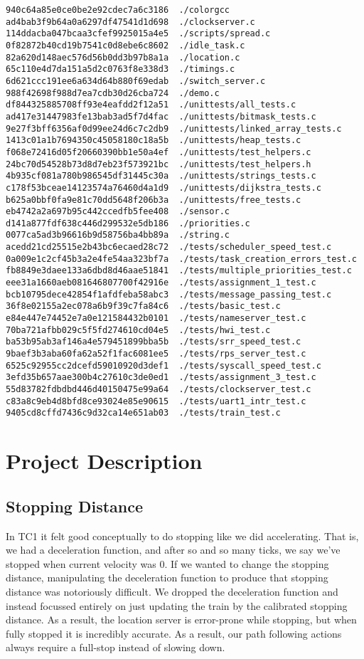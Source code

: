 \documentclass[letterpaper]{article}
\begin{document}
\begin{verbatim}
940c64a85e0ce0be2e92cdec7a6c3186  ./colorgcc
ad4bab3f9b64a0a6297df47541d1d698  ./clockserver.c
114ddacba047bcaa3cfef9925015a4e5  ./scripts/spread.c
0f82872b40cd19b7541c0d8ebe6c8602  ./idle_task.c
82a620d148aec576d56b0dd3b97b8a1a  ./location.c
65c110e4d7da151a5d2c0763f8e338d3  ./timings.c
6d621ccc191ee6a634d64b880f69edab  ./switch_server.c
988f42698f988d7ea7cdb30d26cba724  ./demo.c
df844325885708ff93e4eafdd2f12a51  ./unittests/all_tests.c
ad417e31447983fe13bab3ad5f7d4fac  ./unittests/bitmask_tests.c
9e27f3bff6356af0d99ee24d6c7c2db9  ./unittests/linked_array_tests.c
1413c01a1b7694350c45058180c18a5b  ./unittests/heap_tests.c
f068e72416d05f20660390bb1e50a4ef  ./unittests/test_helpers.c
24bc70d54528b73d8d7eb23f573921bc  ./unittests/test_helpers.h
4b935cf081a780b986545df31445c30a  ./unittests/strings_tests.c
c178f53bceae14123574a76460d4a1d9  ./unittests/dijkstra_tests.c
b625a0bbf0fa9e81c70dd5648f206b3a  ./unittests/free_tests.c
eb4742a2a697b95c442ccedfb5fee408  ./sensor.c
d141a877fdf638c446d299532e5db186  ./priorities.c
0077ca5ad3b96616b9d58756ba4bb89a  ./string.c
acedd21cd25515e2b43bc6ecaed28c72  ./tests/scheduler_speed_test.c
0a009e1c2cf45b3a2e4fe54aa323bf7a  ./tests/task_creation_errors_test.c
fb8849e3daee133a6dbd8d46aae51841  ./tests/multiple_priorities_test.c
eee31a1660aeb081646807700f42916e  ./tests/assignment_1_test.c
bcb10795dece42854f1afdfeba58abc3  ./tests/message_passing_test.c
36f8e02155a2ec078a6b9f39c7fa84c6  ./tests/basic_test.c
e84e447e74452e7a0e121584432b0101  ./tests/nameserver_test.c
70ba721afbb029c5f5fd274610cd04e5  ./tests/hwi_test.c
ba53b95ab3af146a4e579451899bba5b  ./tests/srr_speed_test.c
9baef3b3aba60fa62a52f1fac6081ee5  ./tests/rps_server_test.c
6525c92955cc2dcefd59010920d3def1  ./tests/syscall_speed_test.c
3efd35b657aae300b4c27610c3de0ed1  ./tests/assignment_3_test.c
55d83782fdbdbd446d40150475e99a64  ./tests/clockserver_test.c
c83a8c9eb4d8bfd8ce93024e85e90615  ./tests/uart1_intr_test.c
9405cd8cffd7436c9d32ca14e651ab03  ./tests/train_test.c
\end{verbatim}

\section{Project Description}

\subsection{Stopping Distance}

In TC1 it felt good conceptually to do stopping like we did accelerating. That is, we had a deceleration function, and after so and so many ticks, we say we've stopped when current velocity was 0. If we wanted to change the stopping distance, manipulating the deceleration function to produce that stopping distance was notoriously difficult. We dropped the deceleration function and instead focussed entirely on just updating the train by the calibrated stopping distance. As a result, the location server is error-prone while stopping, but when fully stopped it is incredibly accurate. As a result, our path following actions always require a full-stop instead of slowing down.
\end{document}
